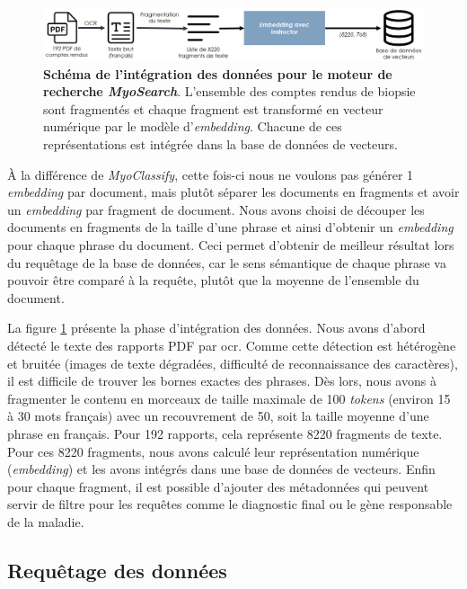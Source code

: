 \begin{figure}[htbp]
 \centering
 \includegraphics[width=1\textwidth]{figures/myosearch_ingest.png}
 \caption[Intégration des données dans \textit{MyoSearch}]{\textbf{Schéma de l'intégration des données pour le moteur de recherche \textit{MyoSearch}}. L'ensemble des comptes rendus de biopsie sont fragmentés et chaque fragment est transformé en vecteur numérique par le modèle d'\textit{embedding}. Chacune de ces représentations est intégrée dans la base de données de vecteurs.}
 \label{fig:myosearch_ingest}
\end{figure}

À la différence de \textit{MyoClassify}, cette fois-ci nous ne voulons pas générer 1 \textit{embedding} par document, mais plutôt séparer les documents en fragments et avoir un \textit{embedding} par fragment de document. Nous avons choisi de découper les documents en fragments de la taille d'une phrase et ainsi d'obtenir un \textit{embedding} pour chaque phrase du document. Ceci permet d'obtenir de meilleur résultat lors du requêtage de la base de données, car le sens sémantique de chaque phrase va pouvoir être comparé à la requête, plutôt que la moyenne de l'ensemble du document.

La figure \ref{fig:myosearch_ingest} présente la phase d'intégration des données. Nous avons d'abord détecté le texte des rapports PDF par \gls{ocr}. Comme cette détection est hétérogène et bruitée (images de texte dégradées, difficulté de reconnaissance des caractères), il est difficile de trouver les bornes exactes des phrases. Dès lors, nous avons à fragmenter le contenu en morceaux de taille maximale de 100 \textit{tokens} (environ 15 à 30 mots français) avec un recouvrement de 50, soit la taille moyenne d'une phrase en français. Pour 192 rapports, cela représente 8220 fragments de texte. Pour ces 8220 fragments, nous avons calculé leur représentation numérique (\textit{embedding}) et les avons intégrés dans une base de données de vecteurs. Enfin pour chaque fragment, il est possible d'ajouter des métadonnées qui peuvent servir de filtre pour les requêtes comme le diagnostic final ou le gène responsable de la maladie.

\subsection{Requêtage des données}

